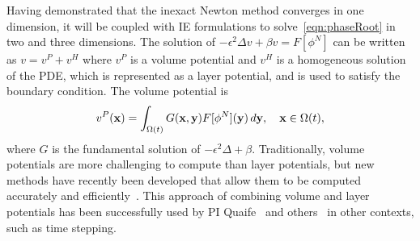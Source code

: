 Having demonstrated that the inexact Newton method converges in one
dimension, it will be coupled with IE formulations to
solve~\eqref{eqn:phaseRoot} in two and three dimensions. The solution of
$-\epsilon^2 \Delta v + \beta v = F[\phi^N]$ can be written
as $v = v^P + v^H$ where $v^P$ is a volume potential and $v^H$ is a
homogeneous solution of the PDE, which is represented as a layer
potential, and is used to satisfy the boundary condition. The volume
potential is
\begin{align}
  v^{P}(\mathbf{x}) = \int_{\Omega(t)} G(\mathbf{x},\mathbf{y}) F[\phi^N](\mathbf{y})\, d\mathbf{y}, 
    \quad \mathbf{x} \in \Omega(t),
\end{align}
where $G$ is the fundamental solution of $-\epsilon^2 \Delta +
\beta$. Traditionally, volume potentials are more challenging
to compute than layer potentials, but new methods have recently been
developed that allow them to be computed accurately and
efficiently~\cite{fry-leh-tor2018, and-zhu-vee2022}. This approach of
combining volume and layer potentials has been successfully used by PI
Quaife~\cite{kro-qua2010} and others~\cite{fry-kro-tor2019,
kli-ask-kro2020, che-hua-lei2005} in other contexts, such as time
stepping.


